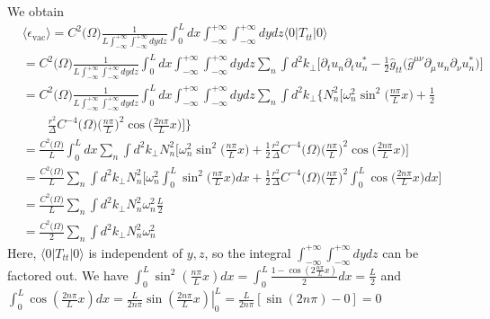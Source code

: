 \documentclass[english]{article}
\begin{document}
We obtain 
\begin{align*}
 & \langle\epsilon_{\text{vac}}\rangle=C^{2}\biggl(\Omega\biggr)\frac{1}{L\int^{+\infty}_{-\infty}\int^{+\infty}_{-\infty}dydz}\int^{L}_{0}dx\int^{+\infty}_{-\infty}\int^{+\infty}_{-\infty}dydz\langle0\vert T_{tt}\vert0\rangle\\
 & =C^{2}\biggl(\Omega\biggr)\frac{1}{L\int^{+\infty}_{-\infty}\int^{+\infty}_{-\infty}dydz}\int^{L}_{0}dx\int^{+\infty}_{-\infty}\int^{+\infty}_{-\infty}dydz\sum_{n}\int d^{2}k_{\perp}\biggl[\partial_{t}u_{n}\partial_{t}u^{*}_{n}-\frac{1}{2}\hat{g}_{tt}\biggl(\hat{g}^{\mu\nu}\partial_{\mu}u_{n}\partial_{\nu}u^{*}_{n}\biggr)\biggr]\\
 & =C^{2}\biggl(\Omega\biggr)\frac{1}{L\int^{+\infty}_{-\infty}\int^{+\infty}_{-\infty}dydz}\int^{L}_{0}dx\int^{+\infty}_{-\infty}\int^{+\infty}_{-\infty}dydz\sum_{n}\int d^{2}k_{\perp}\biggl\{ N^{2}_{n}\biggl[\omega^{2}_{n}\sin^{2}\biggl(\frac{n\pi}{L}x\biggr)+\frac{1}{2}\\
 & \qquad\frac{r^{2}}{\Delta}C^{-4}\biggl(\Omega\biggr)\biggl(\frac{n\pi}{L}\biggr)^{2}\cos\biggl(\frac{2n\pi}{L}x\biggr)\biggr]\biggr\}\\
 & =\frac{C^{2}\biggl(\Omega\biggr)}{L}\int^{L}_{0}dx\sum_{n}\int d^{2}k_{\perp}N^{2}_{n}\biggl[\omega^{2}_{n}\sin^{2}\biggl(\frac{n\pi}{L}x\biggr)+\frac{1}{2}\frac{r^{2}}{\Delta}C^{-4}\biggl(\Omega\biggr)\biggl(\frac{n\pi}{L}\biggr)^{2}\cos\biggl(\frac{2n\pi}{L}x\biggr)\biggr]\\
 & =\frac{C^{2}\biggl(\Omega\biggr)}{L}\sum_{n}\int d^{2}k_{\perp}N^{2}_{n}\biggl[\omega^{2}_{n}\int^{L}_{0}\sin^{2}\biggl(\frac{n\pi}{L}x\biggr)dx+\frac{1}{2}\frac{r^{2}}{\Delta}C^{-4}\biggl(\Omega\biggr)\biggl(\frac{n\pi}{L}\biggr)^{2}\int^{L}_{0}\cos\biggl(\frac{2n\pi}{L}x\biggr)dx\biggr]\\
 & =\frac{C^{2}\biggl(\Omega\biggr)}{L}\sum_{n}\int d^{2}k_{\perp}N^{2}_{n}\omega^{2}_{n}\frac{L}{2}\\
 & =\frac{C^{2}\biggl(\Omega\biggr)}{2}\sum_{n}\int d^{2}k_{\perp}N^{2}_{n}\omega^{2}_{n}
\end{align*}
 Here, $\langle0\vert T_{tt}\vert0\rangle$ is independent of $y,z$,
so the integral $\int^{+\infty}_{-\infty}\int^{+\infty}_{-\infty}dydz$
can be factored out. We have $\int^{L}_{0}\sin^{2}\left(\frac{n\pi}{L}x\right)dx=\int^{L}_{0}\frac{1-\cos\left(2\frac{n\pi}{L}x\right)}{2}dx=\frac{L}{2}$
and $\int^{L}_{0}\cos\left(\frac{2n\pi}{L}x\right)dx=\left.\frac{L}{2n\pi}\sin\left(\frac{2n\pi}{L}x\right)\right|^{L}_{0}=\frac{L}{2n\pi}\left[\sin(2n\pi)-0\right]=0$
\end{document}
